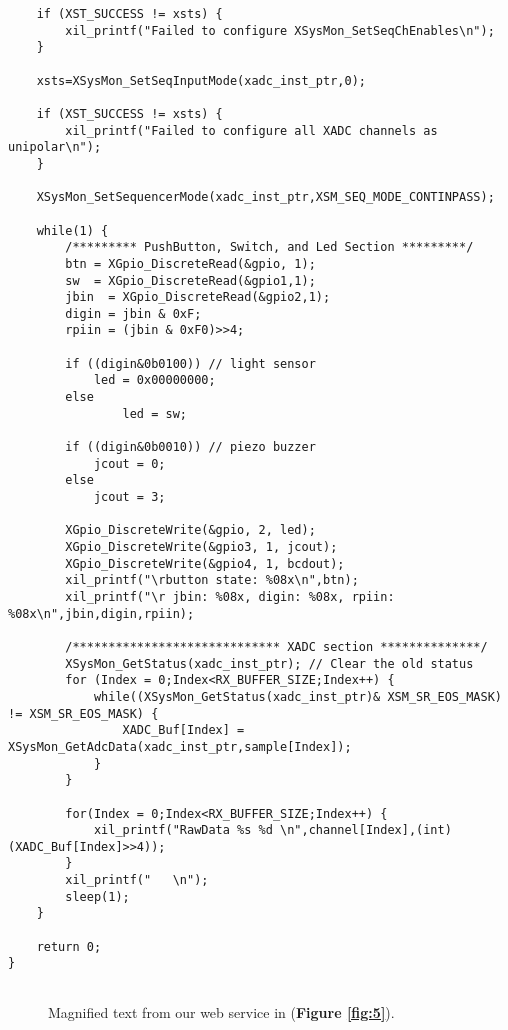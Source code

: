 \documentclass[a4paper]{article}
\begin{document}
\begin{lstlisting}
	if (XST_SUCCESS != xsts) {
		xil_printf("Failed to configure XSysMon_SetSeqChEnables\n");
	}

	xsts=XSysMon_SetSeqInputMode(xadc_inst_ptr,0);

	if (XST_SUCCESS != xsts) {
		xil_printf("Failed to configure all XADC channels as unipolar\n");
	}

	XSysMon_SetSequencerMode(xadc_inst_ptr,XSM_SEQ_MODE_CONTINPASS);

	while(1) {
		/********* PushButton, Switch, and Led Section *********/
		btn = XGpio_DiscreteRead(&gpio, 1);
		sw  = XGpio_DiscreteRead(&gpio1,1);
		jbin  = XGpio_DiscreteRead(&gpio2,1);
		digin = jbin & 0xF;
		rpiin = (jbin & 0xF0)>>4;

		if ((digin&0b0100)) // light sensor
			led = 0x00000000;
		else
				led = sw;

		if ((digin&0b0010)) // piezo buzzer
			jcout = 0;
		else
			jcout = 3;

		XGpio_DiscreteWrite(&gpio, 2, led);
		XGpio_DiscreteWrite(&gpio3, 1, jcout);
		XGpio_DiscreteWrite(&gpio4, 1, bcdout);
		xil_printf("\rbutton state: %08x\n",btn);
		xil_printf("\r jbin: %08x, digin: %08x, rpiin: %08x\n",jbin,digin,rpiin);

		/***************************** XADC section **************/
		XSysMon_GetStatus(xadc_inst_ptr); // Clear the old status
		for (Index = 0;Index<RX_BUFFER_SIZE;Index++) {
			while((XSysMon_GetStatus(xadc_inst_ptr)& XSM_SR_EOS_MASK) != XSM_SR_EOS_MASK) {
				XADC_Buf[Index] = XSysMon_GetAdcData(xadc_inst_ptr,sample[Index]);
			}
		}

		for(Index = 0;Index<RX_BUFFER_SIZE;Index++) {
			xil_printf("RawData %s %d \n",channel[Index],(int)(XADC_Buf[Index]>>4));
		}
		xil_printf("   \n");
		sleep(1);
	}

	return 0;
}


\end{lstlisting}

\begin{figure}
  \caption{Magnified text from our web service in (\textbf{Figure \ref{fig:5}}).}
  \label{fig:mag}
\end{figure}
\end{document}
